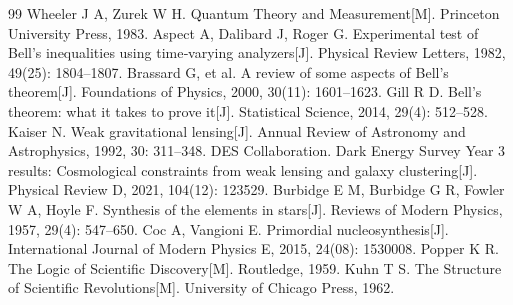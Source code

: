 \documentclass[UTF8]{csoarticle}
\begin{document}
\begin{thebibliography}{99}
 Wheeler J A, Zurek W H. Quantum Theory and Measurement[M]. Princeton University Press, 1983.
 Aspect A, Dalibard J, Roger G. Experimental test of Bell's inequalities using time‑varying analyzers[J]. Physical Review Letters, 1982, 49(25): 1804–1807.
 Brassard G, et al. A review of some aspects of Bell's theorem[J]. Foundations of Physics, 2000, 30(11): 1601–1623.
 Gill R D. Bell's theorem: what it takes to prove it[J]. Statistical Science, 2014, 29(4): 512–528.
 Kaiser N. Weak gravitational lensing[J]. Annual Review of Astronomy and Astrophysics, 1992, 30: 311–348.
 DES Collaboration. Dark Energy Survey Year 3 results: Cosmological constraints from weak lensing and galaxy clustering[J]. Physical Review D, 2021, 104(12): 123529.
 Burbidge E M, Burbidge G R, Fowler W A, Hoyle F. Synthesis of the elements in stars[J]. Reviews of Modern Physics, 1957, 29(4): 547–650.
 Coc A, Vangioni E. Primordial nucleosynthesis[J]. International Journal of Modern Physics E, 2015, 24(08): 1530008.
 Popper K R. The Logic of Scientific Discovery[M]. Routledge, 1959.
 Kuhn T S. The Structure of Scientific Revolutions[M]. University of Chicago Press, 1962.
\end{thebibliography}
\end{document}
